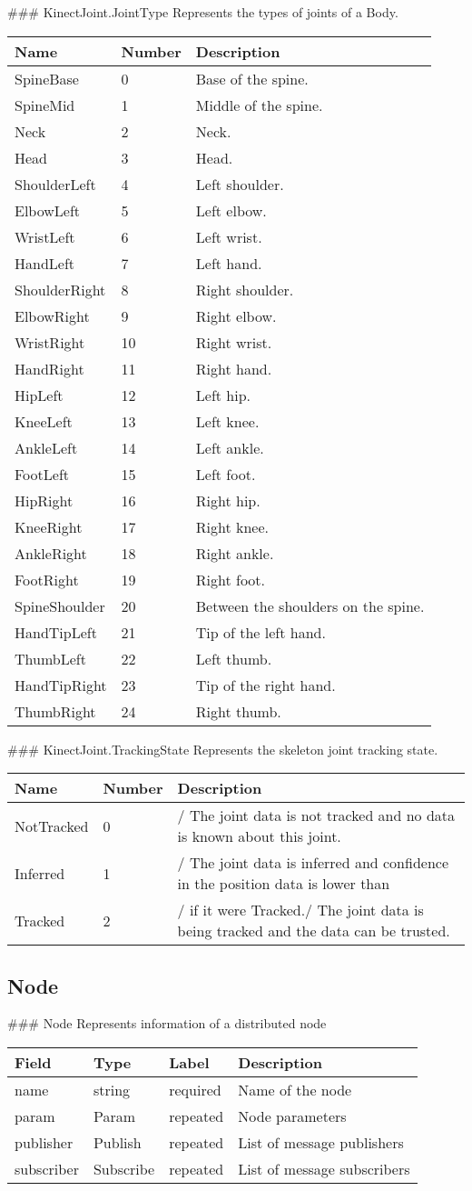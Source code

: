  \#\#\# KinectJoint.JointType Represents the types of joints of a Body.

\begin{longtable}[c]{@{}lll@{}}
\toprule
Name & Number & Description\tabularnewline
\midrule
\endhead
SpineBase & 0 & Base of the spine.\tabularnewline
SpineMid & 1 & Middle of the spine.\tabularnewline
Neck & 2 & Neck.\tabularnewline
Head & 3 & Head.\tabularnewline
ShoulderLeft & 4 & Left shoulder.\tabularnewline
ElbowLeft & 5 & Left elbow.\tabularnewline
WristLeft & 6 & Left wrist.\tabularnewline
HandLeft & 7 & Left hand.\tabularnewline
ShoulderRight & 8 & Right shoulder.\tabularnewline
ElbowRight & 9 & Right elbow.\tabularnewline
WristRight & 10 & Right wrist.\tabularnewline
HandRight & 11 & Right hand.\tabularnewline
HipLeft & 12 & Left hip.\tabularnewline
KneeLeft & 13 & Left knee.\tabularnewline
AnkleLeft & 14 & Left ankle.\tabularnewline
FootLeft & 15 & Left foot.\tabularnewline
HipRight & 16 & Right hip.\tabularnewline
KneeRight & 17 & Right knee.\tabularnewline
AnkleRight & 18 & Right ankle.\tabularnewline
FootRight & 19 & Right foot.\tabularnewline
SpineShoulder & 20 & Between the shoulders on the spine.\tabularnewline
HandTipLeft & 21 & Tip of the left hand.\tabularnewline
ThumbLeft & 22 & Left thumb.\tabularnewline
HandTipRight & 23 & Tip of the right hand.\tabularnewline
ThumbRight & 24 & Right thumb.\tabularnewline
\bottomrule
\end{longtable}

 \#\#\# KinectJoint.TrackingState Represents the skeleton joint tracking
state.

\begin{longtable}[c]{@{}lll@{}}
\toprule
Name & Number & Description\tabularnewline
\midrule
\endhead
NotTracked & 0 & / The joint data is not tracked and no data is known
about this joint.\tabularnewline
Inferred & 1 & / The joint data is inferred and confidence in the
position data is lower than\tabularnewline
Tracked & 2 & / if it were Tracked./ The joint data is being tracked and
the data can be trusted.\tabularnewline
\bottomrule
\end{longtable}

\subsection{Node}\label{node.proto}

 \#\#\# Node Represents information of a distributed node

\begin{longtable}[c]{@{}llll@{}}
\toprule
Field & Type & Label & Description\tabularnewline
\midrule
\endhead
name & string & required & Name of the node\tabularnewline
param & Param & repeated & Node parameters\tabularnewline
publisher & Publish & repeated & List of message
publishers\tabularnewline
subscriber & Subscribe & repeated & List of message
subscribers\tabularnewline
\bottomrule
\end{longtable}

